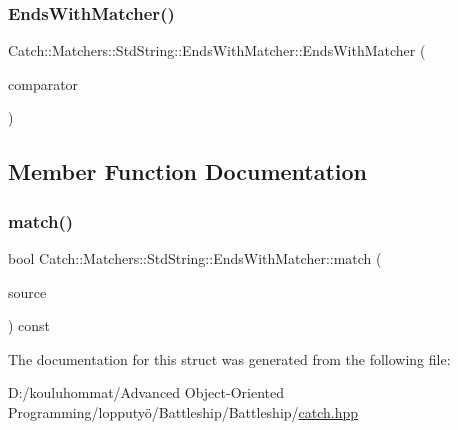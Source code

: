 \subsubsection{\texorpdfstring{Ends\+With\+Matcher()}{EndsWithMatcher()}}
{\footnotesize\ttfamily Catch\+::\+Matchers\+::\+Std\+String\+::\+Ends\+With\+Matcher\+::\+Ends\+With\+Matcher (\begin{DoxyParamCaption}\item[{\mbox{\hyperlink{struct_catch_1_1_matchers_1_1_std_string_1_1_cased_string}{Cased\+String}} const \&}]{comparator }\end{DoxyParamCaption})}



\subsection{Member Function Documentation}
\mbox{\label{struct_catch_1_1_matchers_1_1_std_string_1_1_ends_with_matcher_aca2741fa57374a2a98d2a84ac3e13a6d}} 
\subsubsection{\texorpdfstring{match()}{match()}}
{\footnotesize\ttfamily bool Catch\+::\+Matchers\+::\+Std\+String\+::\+Ends\+With\+Matcher\+::match (\begin{DoxyParamCaption}\item[{std\+::string const \&}]{source }\end{DoxyParamCaption}) const\hspace{0.3cm}{\ttfamily [override]}}



The documentation for this struct was generated from the following file\+:\begin{DoxyCompactItemize}
\item 
D\+:/kouluhommat/\+Advanced Object-\/\+Oriented Programming/lopputyö/\+Battleship/\+Battleship/\mbox{\hyperlink{catch_8hpp}{catch.\+hpp}}\end{DoxyCompactItemize}
